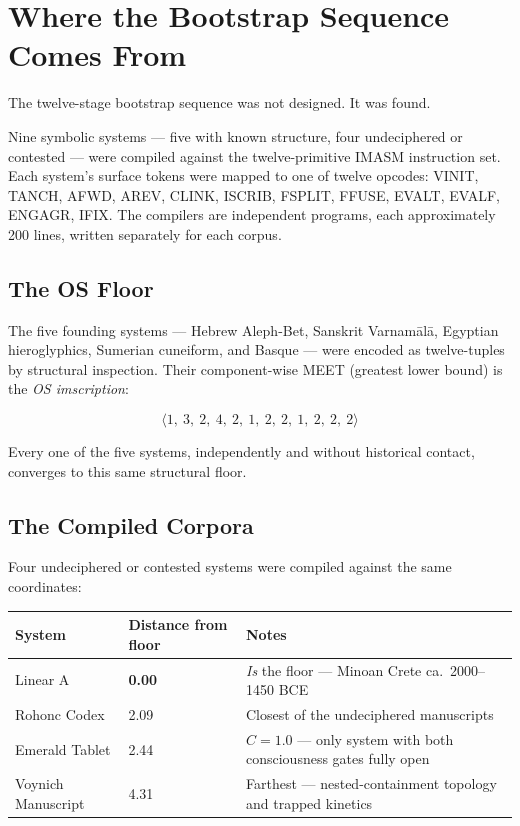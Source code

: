 \documentclass[12pt,a4paper]{article}
\begin{document}
\section{Where the Bootstrap Sequence Comes From}

The twelve-stage bootstrap sequence was not designed. It was found.

Nine symbolic systems — five with known structure, four undeciphered or contested — were compiled against the twelve-primitive IMASM instruction set. Each system's surface tokens were mapped to one of twelve opcodes: VINIT, TANCH, AFWD, AREV, CLINK, ISCRIB, FSPLIT, FFUSE, EVALT, EVALF, ENGAGR, IFIX. The compilers are independent programs, each approximately 200 lines, written separately for each corpus.

\subsection{The OS Floor}

The five founding systems — Hebrew Aleph-Bet, Sanskrit Varnam\={a}l\={a}, Egyptian hieroglyphics, Sumerian cuneiform, and Basque — were encoded as twelve-tuples by structural inspection. Their component-wise MEET (greatest lower bound) is the \emph{OS imscription}:

\[
    \langle 1,\ 3,\ 2,\ 4,\ 2,\ 1,\ 2,\ 2,\ 1,\ 2,\ 2,\ 2 \rangle
\]

Every one of the five systems, independently and without historical contact, converges to this same structural floor.

\subsection{The Compiled Corpora}

Four undeciphered or contested systems were compiled against the same coordinates:

\begin{tabularx}{\linewidth}{l l X}
\toprule
\textbf{System} & \textbf{Distance from floor} & \textbf{Notes} \\
\midrule
Linear A          & \textbf{0.00} & \emph{Is} the floor — Minoan Crete ca.\ 2000--1450 BCE \\
Rohonc Codex      & 2.09          & Closest of the undeciphered manuscripts \\
Emerald Tablet    & 2.44          & $C = 1.0$ — only system with both consciousness gates fully open \\
Voynich Manuscript & 4.31         & Farthest — nested-containment topology and trapped kinetics \\
\bottomrule
\end{tabularx}
\end{document}
